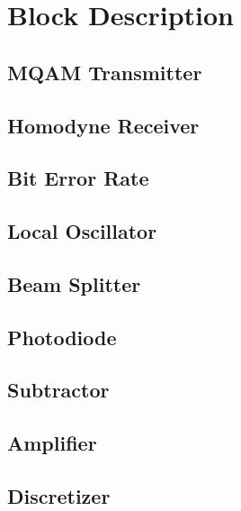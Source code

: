 \documentclass[a4paper]{article}
\begin{document}
\pagebreak


\section{Block Description}

\subsection{MQAM Transmitter}

\subsection{Homodyne Receiver}



\subsection{Bit Error Rate}


\subsection{Local Oscillator}


\subsection{Beam Splitter}


\subsection{Photodiode}


\subsection{Subtractor}


\subsection{Amplifier}


\subsection{Discretizer}

\end{document}
